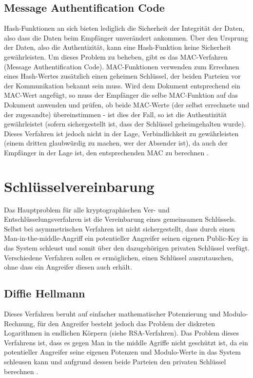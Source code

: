 \documentclass[10pt, a4paper,headsepline,pointednumbers]{scrreprt}
\begin{document}
\subsection{Message Authentification Code}
Hash-Funktionen an sich bieten lediglich die Sicherheit der Integrität der Daten, also dass die Daten beim Empfänger unverändert ankommen. Über den Ursprung der Daten, also die Authentizität, kann eine Hash-Funktion keine Sicherheit gewährleisten. Um dieses Problem zu beheben, gibt es das MAC-Verfahren (Message Authentification Code). MAC-Funktionen verwenden zum Errechnen eines Hash-Wertes zusätzlich einen geheimen Schlüssel, der beiden Parteien vor der Kommunikation bekannt sein muss. Wird dem Dokument entsprechend ein MAC-Wert angefügt, so muss der Empfänger die selbe MAC-Funktion auf das Dokument anwenden und prüfen, ob beide MAC-Werte (der selbst errechnete und der zugesandte) übereinstimmen - ist dies der Fall, so ist die Authentizität gewährleistet (sofern sichergestellt ist, dass der Schlüssel geheimgehalten wurde). Dieses Verfahren ist jedoch nicht in der Lage, Verbindlichkeit zu gewährleisten (einem dritten glaubwürdig zu machen, wer der Absender ist), da auch der Empfänger in der Lage ist, den entsprechenden MAC zu berechnen \citep[S. 97ff] {book:practical-crypto}.


\section{Schlüsselvereinbarung} 
Das Hauptproblem für alle kryptographischen Ver- und Entschlüsselungsverfahren ist die Vereinbarung eines gemeinsamen Schlüssels. Selbst bei asymmetrischen Verfahren ist nicht sichergestellt, dass durch einen Man-in-the-middle-Angriff ein potentieller Angreifer seinen eigenen Public-Key in das System schleust und somit über den dazugehörigen privaten Schlüssel verfügt. Verschiedene Verfahren sollen es ermöglichen, einen Schlüssel auszutauschen, ohne dass ein Angreifer diesen auch erhält.

\subsection{Diffie Hellmann}
Dieses Verfahren beruht auf einfacher mathematischer Potenzierung und Modulo-Rechnung, für den Angreifer besteht jedoch das Problem der diskreten Logarithmen in endlichen Körpern (siehe RSA-Verfahren). Das Problem dieses Verfahrens ist, dass es gegen Man in the middle Agriffe nicht geschützt ist, da ein potentieller Angreifer seine eigenen Potenzen und Modulo-Werte in das System schleusen kann und aufgrund dessen beide Parteien den privaten Schlüssel berechnen \citep[S. 211]{book:practical-crypto} \citep[S. 587]{book:angewandte-krypto}.
\end{document}
